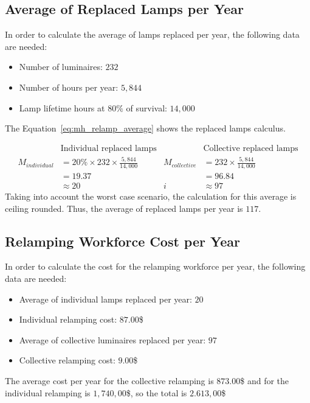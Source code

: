 \subsection{Average of Replaced Lamps per Year}
In order to calculate the average of lamps replaced per year, the following data are needed:
\begin{itemize}
\item Number of luminaires: $232$
\item Number of hours per year: $5,844$
\item Lamp lifetime hours at $80\%$ of survival: $14,000$
\end{itemize}

The Equation~\ref{eq:mh_relamp_average} shows the replaced lamps calculus.

\begin{equation}
\begin{split}
 & \text{Individual replaced lamps} \\
M_{individual} & = 20\% \times 232 \times \frac{5,844}{14,000} \\
 & = 19.37 \\
 & \approx 20
\end{split}
\begin{split}
 & \text{Collective replaced lamps} \\
M_{collective} & = 232 \times \frac {5,844}{14,000} \\
 & = 96.84 \\i
 & \approx 97
\end{split}
\label{eq:mh_relamp_average}
\end{equation}
Taking into account the worst case scenario, the calculation for this average is ceiling rounded. Thus, the average of replaced lamps per year is $117$.

\subsection{Relamping Workforce Cost per Year}
In order to calculate the cost for the relamping workforce per year, the following data are needed:
\begin{itemize}
\item Average of individual lamps replaced per year: $20$
\item Individual relamping cost: $87.00$\$
\item Average of collective luminaires replaced per year: $97$
\item Collective relamping cost: $9.00$\$
\end{itemize}

The average cost per year for the collective relamping is $873.00$\$ and for the individual relamping is $1,740,00$\$, so the total is $2.613,00$\$

